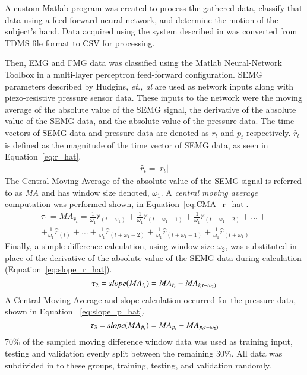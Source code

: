\documentclass[twocolumn]{sagej}
\begin{document}
A custom Matlab program was created to process the gathered data, classify that data using a feed-forward neural network, and determine the motion of the subject's hand.  Data acquired using the system described in \textit{} was converted from TDMS file format to CSV for processing.  \par \noindent
Then, EMG and FMG data was classified using the Matlab Neural-Network Toolbox in a multi-layer perceptron feed-forward configuration.  SEMG parameters described by Hudgins, \textit{et., al} are used as network inputs along with piezo-resistive pressure sensor data\cite{Hudgins01993}.  These inputs to the network were the moving average of the absolute value of the SEMG signal, the derivative of the absolute value of the SEMG data, and the absolute value of the pressure data. The time vectors of SEMG data and pressure data are denoted as $r_{t}$ and $p_{t}$ respectively. $\hat{r}_t$ is defined as the magnitude of the time vector of SEMG data, as seen in Equation~\ref{eq:r_hat}.
\begin{align}
\label{eq:r_hat}
\hat{r}_t = \lvert r_t \rvert
\end{align}
The Central Moving Average of the absolute value of the SEMG signal is referred to as \textit{MA} and has window size denoted, $\omega_1$.  A \textit{central moving average} computation was performed shown, in Equation~\ref{eq:CMA_r_hat}.  
\begin{align}
\label{eq:CMA_r_hat}
\tau_1 = MA_{\hat{r}_t} = \frac{1}{\omega_1}\hat{r}_{(t-\omega_1)} + \frac{1}{\omega_1}\hat{r}_{(t-\omega_1-1)} + \frac{1}{\omega_1}\hat{r}_{(t-\omega_1-2)} + \ldots + \nonumber \\
+ \frac{1}{\omega_1}\hat{r}_{(t)} + \ldots + \frac{1}{\omega_1}\hat{r}_{(t+\omega_1-2)} + \frac{1}{\omega_1}\hat{r}_{(t+\omega_1-1)} + \frac{1}{\omega_1}\hat{r}_{(t+\omega_1)}
\end{align}
Finally, a simple difference calculation, using window size $\omega_2$, was substituted in place of the derivative of the absolute value of the SEMG data during calculation (Equation~\ref{eq:slope_r_hat}).  
\begin{equation}
\label{eq:slope_r_hat}
\tau_2 = \textit{slope}(MA_{\hat{r}_t}) = MA_{\hat{r}_t} - MA_{\hat{r}_(t-\omega_2)}\\
\end{equation}
A Central Moving Average and slope calculation occurred for the pressure data, shown in Equation ~\ref{eq:slope_p_hat}.  
\begin{equation}
\label{eq:slope_p_hat}
	\tau_3 = \textit{slope}(MA_{\hat{p}_t}) = MA_{{p}_t} - MA_{{p}_(t-\omega_2)}\\
\end{equation}
70$\%$ of the sampled moving difference window data was used as training input, testing and validation evenly split between the remaining 30$\%$.  All data was subdivided in to these groups, training, testing, and validation randomly. \par \noindent
\end{document}
